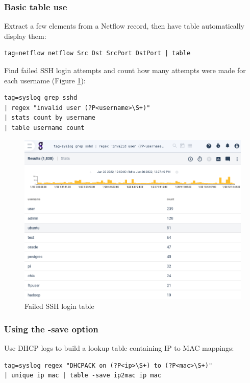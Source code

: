 \subsubsection{Basic table use}

Extract a few elements from a Netflow record, then have table
automatically display them:

\begin{Verbatim}[breaklines=true]
tag=netflow netflow Src Dst SrcPort DstPort | table
\end{Verbatim}

Find failed SSH login attempts and count how many attempts were made for each username (Figure \ref{fig:table-ssh-bruteforce}):

\begin{Verbatim}[breaklines=true]
tag=syslog grep sshd 
| regex "invalid user (?P<username>\S+)" 
| stats count by username 
| table username count
\end{Verbatim}

\begin{figure}
	\includegraphics[width=0.7\linewidth]{images/table-ssh-bruteforce.png}
	\caption{Failed SSH login table}
	\label{fig:table-ssh-bruteforce}
\end{figure}

\subsubsection{Using the -save option}

Use DHCP logs to build a lookup table containing IP to MAC mappings:

\begin{Verbatim}[breaklines=true]
tag=syslog regex "DHCPACK on (?P<ip>\S+) to (?P<mac>\S+)"
| unique ip mac | table -save ip2mac ip mac
\end{Verbatim}

